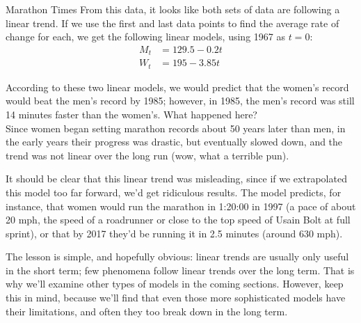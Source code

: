 \begin{example}[https://www.youtube.com/watch?v=3FeV7lvkATI]{Marathon Times}
From this data, it looks like both sets of data are following a linear trend.  If we use the first and last data points to find the average rate of change for each, we get the following linear models, using 1967 as $t=0$:
\begin{align*}
M_t &= 129.5-0.2t\\
W_t &= 195-3.85t
\end{align*}

According to these two linear models, we would predict that the women's record would beat the men's record by 1985; however, in 1985, the men's record was still 14 minutes faster than the women's.  What happened here?\\

Since women began setting marathon records about 50 years later than men, in the early years their progress was drastic, but eventually slowed down, and the trend was not linear over the long run (wow, what a terrible pun).
\end{example}

It should be clear that this linear trend was misleading, since if we extrapolated this model too far forward, we'd get ridiculous results.  The model predicts, for instance, that women would run the marathon in 1:20:00 in 1997 (a pace of about 20 mph, the speed of a roadrunner or close to the top speed of Usain Bolt at full sprint), or that by 2017 they'd be running it in 2.5 minutes (around 630 mph).

The lesson is simple, and hopefully obvious: linear trends are usually only useful in the short term; few phenomena follow linear trends over the long term.  That is why we'll examine other types of models in the coming sections.  However, keep this in mind, because we'll find that even those more sophisticated models have their limitations, and often they too break down in the long term.